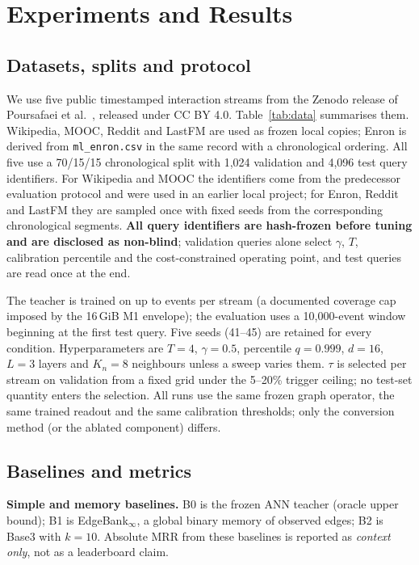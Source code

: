 \documentclass[preprint,12pt]{elsarticle}
\begin{document}
\section{Experiments and Results}
\label{sec:results}

\subsection{Datasets, splits and protocol}
\label{sec:setup}

We use five public timestamped interaction streams from the Zenodo release of Poursafaei et al.\ \cite{poursafaei2022dataset,poursafaei2022}, released under CC BY 4.0. Table~\ref{tab:data} summarises them. Wikipedia, MOOC, Reddit and LastFM are used as frozen local copies; Enron is derived from \texttt{ml\_enron.csv} in the same record with a chronological ordering. All five use a 70/15/15 chronological split with 1,024 validation and 4,096 test query identifiers. For Wikipedia and MOOC the identifiers come from the predecessor evaluation protocol and were used in an earlier local project; for Enron, Reddit and LastFM they are sampled once with fixed seeds from the corresponding chronological segments. \textbf{All query identifiers are hash-frozen before tuning and are disclosed as non-blind}; validation queries alone select $\gamma$, $T$, calibration percentile and the cost-constrained operating point, and test queries are read once at the end.



The teacher is trained on up to \TrainCoverage{} events per stream (a documented coverage cap imposed by the 16\,GiB M1 envelope); the evaluation uses a 10,000-event window beginning at the first test query. Five seeds (41--45) are retained for every condition. Hyperparameters are $T{=}4$, $\gamma{=}0.5$, percentile $q{=}0.999$, $d{=}16$, $L{=}3$ layers and $K_n{=}8$ neighbours unless a sweep varies them. $\tau$ is selected per stream on validation from a fixed grid under the 5--20\% trigger ceiling; no test-set quantity enters the selection. All runs use the same frozen graph operator, the same trained readout and the same calibration thresholds; only the conversion method (or the ablated component) differs.

\subsection{Baselines and metrics}

\textbf{Simple and memory baselines.} B0 is the frozen ANN teacher (oracle upper bound); B1 is EdgeBank$_\infty$, a global binary memory of observed edges; B2 is Base3 with $k{=}10$. Absolute MRR from these baselines is reported as \emph{context only}, not as a leaderboard claim.
\end{document}
